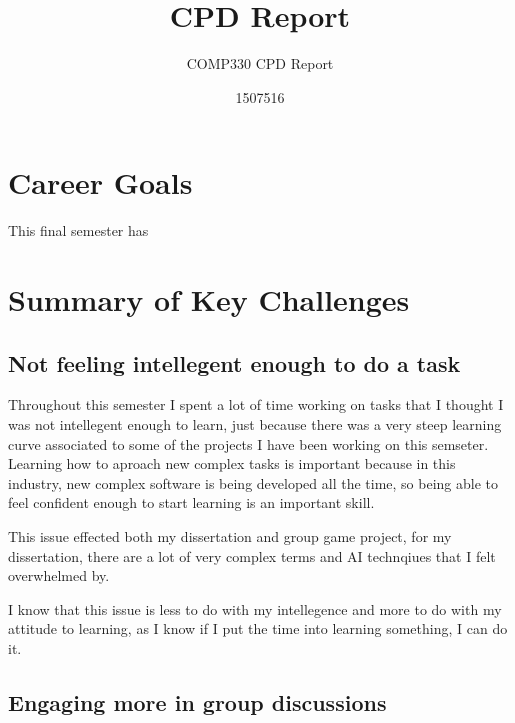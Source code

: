 \documentclass{scrartcl}
\title{CPD Report}
\subtitle{COMP330 CPD Report}
\author{1507516}
\begin{document}
\maketitle


\section{Career Goals}
This final semester has 


\section{Summary of Key Challenges}


\subsection{Not feeling intellegent enough to do a task}
Throughout this semester I spent a lot of time working on tasks that I thought I was not intellegent enough to learn, just because there was a very steep learning curve associated to some of the projects I have been working on this semseter.
Learning how to aproach new complex tasks is important because in this industry, new complex software is being developed all the time, so being able to feel confident enough to start learning is an important skill.
\par

This issue effected both my dissertation and group game project, for my dissertation, there are a lot of very complex terms and AI technqiues that I felt overwhelmed by.

\par

I know that this issue is less to do with my intellegence and more to do with my attitude to learning, as I know if I put the time into learning something, I can do it.





\subsection{Engaging more  in group discussions}
\end{document}
